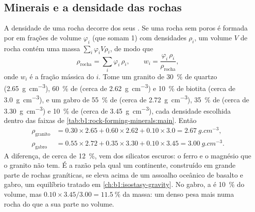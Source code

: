\subsection{Minerais e a densidade das rochas}

A densidade de uma rocha decorre dos seus . Se uma rocha sem poros é formada por  em frações de volume $\varphi_i$ (que somam 1) com densidades $\rho_i$, um volume $V$ de rocha contém uma massa
$\sum_i \varphi_i V \rho_i$, de modo que
\[
  \rho_{\text{rocha}} = \sum_i \varphi_i\,\rho_i ,
  \qquad
  w_i = \frac{\varphi_i\,\rho_i}{\rho_{\text{rocha}}},
\]
onde $w_i$ é a fração mássica do  $i$. Tome um granito de \qty{30}{\percent} de quartzo (\qty{2.65}{g.cm^{-3}}), \qty{60}{\percent} de  (cerca de \qty{2.62}{g.cm^{-3}}) e \qty{10}{\percent} de biotita (cerca de \qty{3.0}{g.cm^{-3}}), e um gabro de \qty{55}{\percent} de  (cerca de \qty{2.72}{g.cm^{-3}}), \qty{35}{\percent} de  (cerca de \qty{3.30}{g.cm^{-3}}) e \qty{10}{\percent} de  (cerca de \qty{3.45}{g.cm^{-3}}), cada densidade escolhida dentro das faixas de
\cref{tab:b1:rock-forming-minerals:main}. Então
\begin{align*}
  \rho_{\text{granito}} &= 0.30\times2.65 + 0.60\times2.62 + 0.10\times3.0
  = \qty{2.67}{g.cm^{-3}},\\
  \rho_{\text{gabro}} &= 0.55\times2.72 + 0.35\times3.30 + 0.10\times3.45
  = \qty{3.00}{g.cm^{-3}}.
\end{align*}
A diferença, de cerca de \qty{12}{\percent}, vem dos silicatos escuros: o ferro e o magnésio que o granito não tem. É a razão pela qual um continente, construído em grande parte de rochas graníticas, se eleva acima de um assoalho oceânico de basalto e gabro, um equilíbrio tratado em \cref{ch:b1:isostasy-gravity}. No gabro, a  é \qty{10}{\percent} do volume, mas $0.10\times3.45/3.00 = \qty{11.5}{\percent}$ da massa: um  denso pesa mais numa rocha do que a sua parte no volume.


